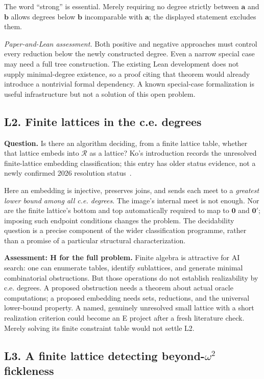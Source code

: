 \documentclass[11pt,a4paper]{article}
\newcommand{\Rce}{\mathcal R}
\newcommand{\adeg}{\mathbf a}\newcommand{\bdeg}{\mathbf b}
\newcommand{\assessment}[1]{\par\noindent\textit{Paper-and-Lean assessment.} #1\par}
\newcommand{\problem}[2]{\subsection{#1. #2}\label{entry:#1}}
\theoremstyle{definition}\newtheorem{definition}[theorem]{Definition}
\theoremstyle{remark}\newtheorem{remark}[theorem]{Remark}
\begin{document}
The word ``strong'' is essential. Merely requiring no degree strictly between $\adeg$ and $\bdeg$ allows degrees below $\bdeg$ incomparable with $\adeg$; the displayed statement excludes them.

\assessment{Both positive and negative approaches must control every reduction below the newly constructed degree. Even a narrow special case may need a full tree construction. The existing Lean development does not supply minimal-degree existence, so a proof citing that theorem would already introduce a nontrivial formal dependency. A known special-case formalization is useful infrastructure but not a solution of this open problem.}

\problem{L2}{Finite lattices in the c.e. degrees}
\textbf{Question.} Is there an algorithm deciding, from a finite lattice table,
whether that lattice embeds into $\Rce$ as a lattice? Ko's introduction records
the unresolved finite-lattice embedding classification; this entry has older
status evidence, not a newly confirmed 2026 resolution status~\cite{Ko}.

Here an embedding is injective, preserves joins, and sends each meet to a
\emph{greatest lower bound among all c.e. degrees}. The image's internal meet is
not enough. Nor are the finite lattice's bottom and top automatically required
to map to $\mathbf0$ and $\mathbf0'$; imposing such endpoint conditions changes
the problem. The decidability question is a precise component of the wider
classification programme, rather than a promise of a particular structural
characterization.

\textbf{Assessment: H for the full problem.} Finite algebra is attractive for
AI search: one can enumerate tables, identify sublattices, and generate minimal
combinatorial obstructions. But those operations do not establish realizability
by c.e. degrees. A proposed obstruction needs a theorem about actual oracle
computations; a proposed embedding needs sets, reductions, and the universal
lower-bound property. A named, genuinely unresolved small lattice with a short
realization criterion could become an E project after a fresh literature check.
Merely solving its finite constraint table would not settle L2.


\subsection[L3. A finite lattice detecting beyond-omega-squared fickleness]{L3. A finite lattice detecting beyond-$\omega^2$ fickleness \Lmark}
\label{entry:L3}
\label{sec:fickle}
\end{document}
